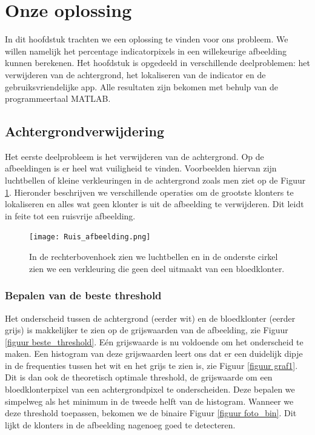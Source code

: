 \documentclass[a4paper,kulak]{kulakarticle}
\begin{document}
\section{Onze oplossing}
In dit hoofdstuk trachten we een oplossing te vinden voor ons probleem. We willen namelijk het percentage indicatorpixels in een willekeurige afbeelding kunnen berekenen. Het hoofdstuk is opgedeeld in verschillende deelproblemen: het verwijderen van de achtergrond, het lokaliseren van de indicator en de gebruiksvriendelijke app. Alle resultaten zijn bekomen met behulp van de programmeertaal MATLAB.

\subsection{Achtergrondverwijdering} \label{Achtergrondverwijdering}
Het eerste deelprobleem is het verwijderen van de achtergrond. Op de afbeeldingen is er heel wat vuiligheid te vinden. Voorbeelden hiervan zijn luchtbellen of kleine verkleuringen in de achtergrond zoals men ziet op de Figuur \ref{figuur achtergrondverwijdering}. Hieronder beschrijven we verschillende operaties om de grootste klonters te lokaliseren en alles wat geen klonter is uit de afbeelding te verwijderen. Dit leidt in feite tot een ruisvrije afbeelding.

\begin{figure}[H]
	\centering
	\texttt{[image: Ruis\_afbeelding.png]}	
	\caption{In de rechterbovenhoek zien we luchtbellen en in de onderste cirkel zien we een verkleuring die geen deel uitmaakt van een bloedklonter.}
	\label{figuur achtergrondverwijdering}
\end{figure}

\subsubsection{Bepalen van de beste threshold}
Het onderscheid tussen de achtergrond (eerder wit) en de bloedklonter (eerder grijs) is makkelijker te zien op de grijswaarden van de afbeelding, zie Figuur \ref{figuur beste_threshold}. Eén grijswaarde is nu voldoende om het onderscheid te maken. Een histogram van deze grijswaarden leert ons dat er een duidelijk dipje in de frequenties tussen het wit en het grijs te zien is, zie Figuur \ref{figuur graf1}. Dit is dan ook de theoretisch optimale threshold, de grijswaarde om een bloedklonterpixel van een achtergrondpixel te onderscheiden. Deze bepalen we simpelweg als het minimum in de tweede helft van de histogram. Wanneer we deze threshold toepassen, bekomen we de binaire Figuur \ref{figuur foto_bin}. Dit lijkt de klonters in de afbeelding nagenoeg goed te detecteren.
\end{document}
